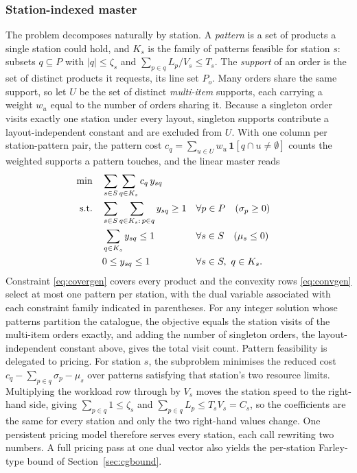 \documentclass[]{interact}
\begin{document}
\subsubsection{Station-indexed master}\label{sec:cgmaster}
The problem decomposes naturally by station. A \emph{pattern} is a set of products a single station could hold, and $K_s$ is the family of patterns feasible for station $s$: subsets $q \subseteq P$ with $|q| \le \zeta_s$ and $\sum_{p \in q} L_p / V_s \le T_s$. The \emph{support} of an order is the set of distinct products it requests, its line set $P_o$. Many orders share the same support, so let $U$ be the set of distinct \emph{multi-item} supports, each carrying a weight $w_u$ equal to the number of orders sharing it. Because a singleton order visits exactly one station under every layout, singleton supports contribute a layout-independent constant and are excluded from $U$. With one column per station-pattern pair, the pattern cost $c_q = \sum_{u \in U} w_u\,\mathbf{1}[q \cap u \neq \emptyset]$ counts the weighted supports a pattern touches, and the linear master reads
\begin{align}
\min \quad & \sum_{s \in S} \sum_{q \in K_s} c_q\, y_{sq} \notag\\
\text{s.t.} \quad
& \sum_{s \in S} \sum_{q \in K_s:\, p \in q} y_{sq} \ge 1 && \forall p \in P \quad (\sigma_p \ge 0) \label{eq:covergen}\\
& \sum_{q \in K_s} y_{sq} \le 1 && \forall s \in S \quad (\mu_s \le 0) \label{eq:convgen}\\
& 0 \le y_{sq} \le 1 && \forall s \in S,\ q \in K_s. \notag
\end{align}
Constraint \eqref{eq:covergen} covers every product and the convexity rows \eqref{eq:convgen} select at most one pattern per station, with the dual variable associated with each constraint family indicated in parentheses. For any integer solution whose patterns partition the catalogue, the objective equals the station visits of the multi-item orders exactly, and adding the number of singleton orders, the layout-independent constant above, gives the total visit count. Pattern feasibility is delegated to pricing. For station $s$, the subproblem minimises the reduced cost $c_q - \sum_{p \in q} \sigma_p - \mu_s$ over patterns satisfying that station's two resource limits. Multiplying the workload row through by $V_s$ moves the station speed to the right-hand side, giving $\sum_{p \in q} 1 \le \zeta_s$ and $\sum_{p \in q} L_p \le T_s V_s = C_s$, so the coefficients are the same for every station and only the two right-hand values change. One persistent pricing model therefore serves every station, each call rewriting two numbers. A full pricing pass at one dual vector also yields the per-station Farley-type bound of Section~\ref{sec:cgbound}.
\end{document}
